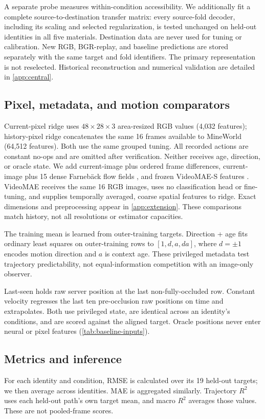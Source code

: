 \documentclass{article}
\begin{document}
A separate probe measures within-condition accessibility. We additionally fit a complete source-to-destination transfer matrix: every source-fold decoder, including its scaling and selected regularization, is tested unchanged on held-out identities in all five materials. Destination data are never used for tuning or calibration. New RGB, BGR-replay, and baseline predictions are stored separately with the same target and fold identifiers. The primary representation is not reselected. Historical reconstruction and numerical validation are detailed in \autoref{app:central}.

\subsection{Pixel, metadata, and motion comparators}
\label{sec:baselines}
Current-pixel ridge uses $48\times28\times3$ area-resized RGB values (4,032 features); history-pixel ridge concatenates the same 16 frames available to MineWorld (64,512 features). Both use the same grouped tuning. All recorded actions are constant no-ops and are omitted after verification. Neither receives age, direction, or oracle state. We add current-image plus ordered frame differences, current-image plus 15 dense Farneb\"ack flow fields \citep{farneback2003two}, and frozen VideoMAE-S features \citep{tong2022videomae}. VideoMAE receives the same 16 RGB images, uses no classification head or fine-tuning, and supplies temporally averaged, coarse spatial features to ridge. Exact dimensions and preprocessing appear in \autoref{app:extension}. These comparisons match history, not all resolutions or estimator capacities.

The training mean is learned from outer-training targets. Direction + age fits ordinary least squares on outer-training rows to $[1,d,a,da]$, where $d=\pm1$ encodes motion direction and $a$ is context age. These privileged metadata test trajectory predictability, not equal-information competition with an image-only observer.

Last-seen holds raw server position at the last non-fully-occluded row. Constant velocity regresses the last ten pre-occlusion raw positions on time and extrapolates. Both use privileged state, are identical across an identity's conditions, and are scored against the aligned target. Oracle positions never enter neural or pixel features (\autoref{tab:baseline-inputs}).




\subsection{Metrics and inference}
\label{sec:inference}
For each identity and condition, RMSE is calculated over its 19 held-out targets;
we then average across identities. MAE is aggregated similarly. Trajectory $R^2$
uses each held-out path's own target mean, and macro $R^2$ averages those values.
These are not pooled-frame scores.
\end{document}
